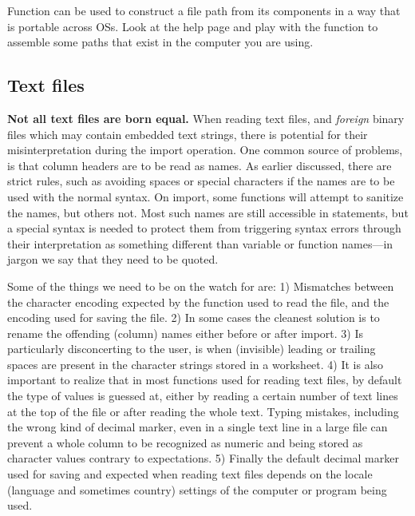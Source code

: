 \documentclass[krantz2]{krantz}\usepackage{knitr}%
\begin{document}
\begin{playground}
Function  can be used to construct a file path from its components in a way that is portable across OSs. Look at the help page and play with the function to assemble some paths that exist in the computer you are using.
\end{playground}

\subsection{Text files}\label{sec:files:txt}

\begin{warningbox}
\textbf{Not all text files are born equal.} When reading text files, and \emph{foreign} binary files which may contain embedded text strings, there is potential for their misinterpretation during the import operation. One common source of problems, is that column headers are to be read as \Rlang names. As earlier discussed, there are strict rules, such as avoiding spaces or special characters if the names are to be used with the normal syntax. On import, some functions will attempt to sanitize the names, but others not. Most such names are still accessible in \Rlang statements, but a special syntax is needed to protect them from triggering syntax errors through their interpretation as something different than variable or function names---in \Rlang jargon we say that they need to be quoted.

Some of the things we need to be on the watch for are:
1) Mismatches between the character encoding expected by the function used to read the file, and the encoding used for saving the file.
2) In some cases the cleanest solution is to rename the offending (column) names either before or after import.
3) Is particularly disconcerting to the user, is when (invisible) leading or trailing spaces are present in the character strings stored in a worksheet.
4) It is also important to realize that in most functions used for reading text files, by default the type of values is guessed at, either by reading a certain number of text lines at the top of the file or after reading the whole text. Typing mistakes, including the wrong kind of decimal marker, even in a single text line in a large file can prevent a whole column to be recognized as numeric and being stored as character values contrary to expectations.
5) Finally the default decimal marker used for saving and expected when reading text files depends on the locale (language and sometimes country) settings of the computer or program being used.


\end{warningbox}
\end{document}
